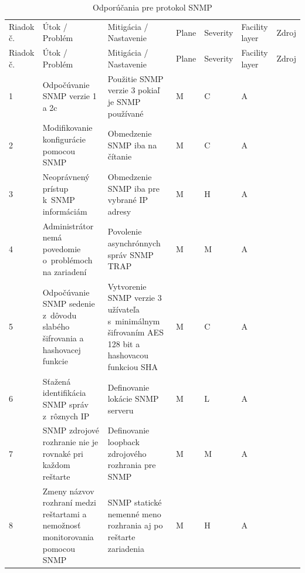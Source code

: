 \begin{longtable}[!htbp]{|C{2.5em}L{11em}L{11em}C{2.5em}C{4em}C{5em}L{2.5em}|}
	
	\caption{Odporúčania pre protokol SNMP}
	\label{tab:snmp}\\ \hline
	\mbox{Riadok} č.&Útok / Problém	&Mitigácia / Nastavenie	&Plane	&Severity	&Facility layer	&Zdroj\\ \hhline{=======}
	\endfirsthead 
	\hline
	\centering
	
	Riadok č.	&Útok / Problém	&Mitigácia / Nastavenie	&Plane	&Severity	&Facility layer	&Zdroj\\ \hhline{=======}
	\endhead
	
	 1	&Odpočúvanie SNMP verzie 1 a 2c	&Použitie SNMP verzie 3 pokiaľ je SNMP používané	&M	&C	&A	& \cite{CIS_DrTLsgXv24lxeIIM}
	
	\cite{Graesser2001}\\
	2	&Modifikovanie konfigurácie pomocou SNMP	&Obmedzenie SNMP iba na čítanie	&M	&C	&A	& \cite{CIS_DrTLsgXv24lxeIIM}
	
	\cite{Graesser2001}
	
	\cite{Akin2002}\\
	 3	&Neoprávnený prístup k~SNMP informáciám	&Obmedzenie SNMP iba pre vybrané IP adresy	&M	&H	&A	& \cite{CIS_DrTLsgXv24lxeIIM}
	
	\cite{Graesser2001}\\
	4	&Administrátor nemá povedomie o~problémoch na zariadení	&Povolenie asynchrónnych správ SNMP TRAP	&M	&M	&A	& \cite{CIS_DrTLsgXv24lxeIIM}
	
	\cite{Graesser2001}
	
	\cite{Akin2002}\\
	 5	&Odpočúvanie SNMP sedenie z~dôvodu slabého šifrovania a hashovacej  funkcie	&Vytvorenie SNMP verzie 3 užívateľa s~minimálnym šifrovaním AES 128 bit a hashovacou funkciou SHA	&M	&C	&A	& \cite{Barker2019}
	
	\cite{CIS_DrTLsgXv24lxeIIM}
	
	\cite{Akin2002}\\
	6	&Sťažená identifikácia SNMP správ z~rôznych IP	&Definovanie lokácie SNMP serveru	&M	&L	&A	& \cite{Dooley2007}\\
	 7	&SNMP zdrojové rozhranie nie je rovnaké pri každom reštarte	& Definovanie loopback zdrojového rozhrania pre SNMP	&M	&M	&A	& \cite{CIS_DrTLsgXv24lxeIIM}\\
	8	&Zmeny názvov rozhraní medzi reštartami a nemožnosť monitorovania pomocou SNMP	&SNMP statické nemenné meno rozhrania aj po reštarte zariadenia	&M	&H	&A	& \cite{Dooley2007}\\
	
	\hline
\end{longtable}%


